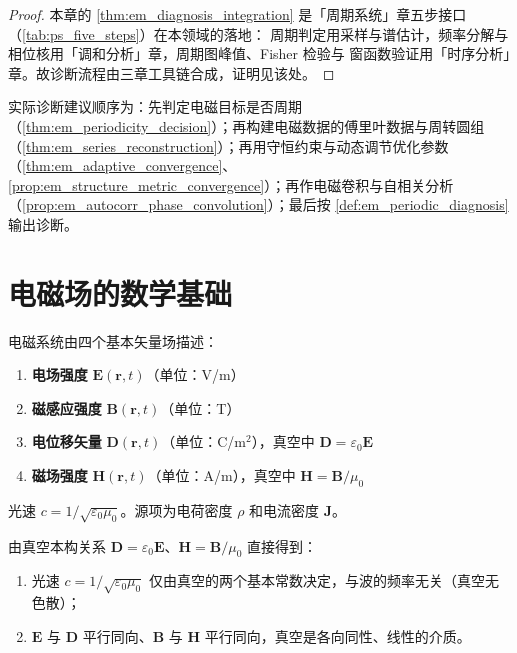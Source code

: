 \begin{proof}
本章的 \cref{thm:em_diagnosis_integration} 是「周期系统」章五步接口（\cref{tab:ps_five_steps}）在本领域的落地：
周期判定用采样与谱估计，频率分解与相位核用「调和分析」章，周期图峰值、Fisher 检验与
窗函数验证用「时序分析」章。故诊断流程由三章工具链合成，证明见该处。
\end{proof}

\begin{remark}[整合后的操作顺序]\label{rem:em_integration_order}
实际诊断建议顺序为：先判定电磁目标是否周期（\cref{thm:em_periodicity_decision}）；再构建电磁数据的傅里叶数据与周转圆组（\cref{thm:em_series_reconstruction}）；再用守恒约束与动态调节优化参数（\cref{thm:em_adaptive_convergence}、\cref{prop:em_structure_metric_convergence}）；再作电磁卷积与自相关分析（\cref{prop:em_autocorr_phase_convolution}）；最后按 \cref{def:em_periodic_diagnosis} 输出诊断。
\end{remark}

\section{电磁场的数学基础}

\begin{definition}[电磁场的基本量]\label{def:electromagnetic_fields}
电磁系统由四个基本矢量场描述：
\begin{enumerate}[label=(\roman*)]
    \item \textbf{电场强度} $\mathbf{E}(\mathbf{r}, t)$（单位：V/m）
    \item \textbf{磁感应强度} $\mathbf{B}(\mathbf{r}, t)$（单位：T）
    \item \textbf{电位移矢量} $\mathbf{D}(\mathbf{r}, t)$（单位：C/m$^2$），真空中 $\mathbf{D} = \varepsilon_0 \mathbf{E}$
    \item \textbf{磁场强度} $\mathbf{H}(\mathbf{r}, t)$（单位：A/m），真空中 $\mathbf{H} = \mathbf{B}/\mu_0$
\end{enumerate}
光速 $c = 1/\sqrt{\varepsilon_0 \mu_0}$。源项为电荷密度 $\rho$ 和电流密度 $\mathbf{J}$。
\end{definition}

\begin{property}[真空本构关系的直接后果]\label{ch21_vacuum_props}
由真空本构关系 $\mathbf{D}=\varepsilon_0\mathbf{E}$、$\mathbf{H}=\mathbf{B}/\mu_0$ 直接得到：
\begin{enumerate}[label=(\roman*)]
    \item 光速 $c = 1/\sqrt{\varepsilon_0\mu_0}$ 仅由真空的两个基本常数决定，与波的频率无关（真空无色散）；
    \item $\mathbf{E}$ 与 $\mathbf{D}$ 平行同向、$\mathbf{B}$ 与 $\mathbf{H}$ 平行同向，真空是各向同性、线性的介质。
\end{enumerate}
\end{property}

